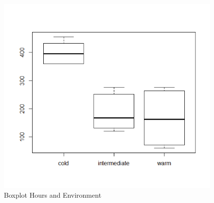 \documentclass{article}
\begin{document}
      \begin{figure}
        \includegraphics[scale=0.6]{../results/BoxHoursEnv.png}
        \caption{Boxplot Hours and Environment}
        \label{fig:BoxHoursHum}
      \end{figure}
    
\end{document}
